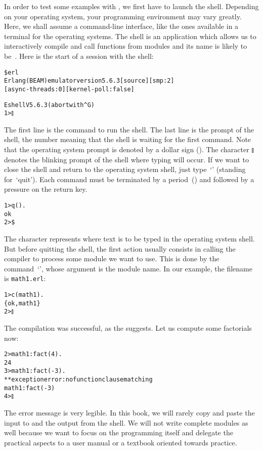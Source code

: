 In order to test some examples with , we first have to
launch the \Erlang shell. Depending on your operating system, your
programming environment may vary greatly. Here, we shall assume a
command\hyp{}line interface, like the ones available in a terminal for
the \Unix operating systems. The \Erlang shell is an application which
allows us to interactively compile and call functions from modules and
its name is likely to be~. Here is the start of a session
with the shell:
\begin{alltt}
\$ erl
Erlang (BEAM) emulator version 5.6.3 [source] [smp:2]
[async-threads:0] [kernel-poll:false]

Eshell V5.6.3  (abort with ^G)
1> \(\talloblong\)
\end{alltt}
The first line is the command to run the shell. The last line is the
prompt of the \Erlang shell, the number meaning that the shell is
waiting for the first command. Note that the operating system prompt
is denoted by a dollar sign (\erlcode{\$}). The character
\(\talloblong\) denotes the blinking prompt of the \Erlang shell where
typing will occur. If we want to close the shell and return to the
operating system shell, just type~`' (standing
for~`quit'). Each command must be terminated by a
period~()  and followed by a pressure on the return key.
\begin{alltt}
1> q().
ok
2> \$ \textvisiblespace
\end{alltt}
The character \erlcode{\textvisiblespace} represents where text is to
be typed in the operating system shell. But before quitting the
\Erlang shell, the first action usually consists in calling the
\Erlang compiler to process some module we want to use. This is done
by the command~`', whose argument is the module name. In
our example, the filename is \texttt{math1.erl}:
\begin{alltt}
1> c(math1).
\{ok,math1\}
2> \(\talloblong\)
\end{alltt}
The compilation was successful, as the  suggests. Let us
compute some factorials now:
\begin{alltt}
2> math1:fact(4).
24
3> math1:fact(-3).
** exception error: no function clause matching
math1:fact(-3)
4> \(\talloblong\)
\end{alltt}
The error message is very legible. In this book, we will rarely copy
and paste the input to and the output from the \Erlang shell. We will
not write complete modules as well because we want to focus on the
programming itself and delegate the practical aspects to a user manual
or a textbook oriented towards practice.


